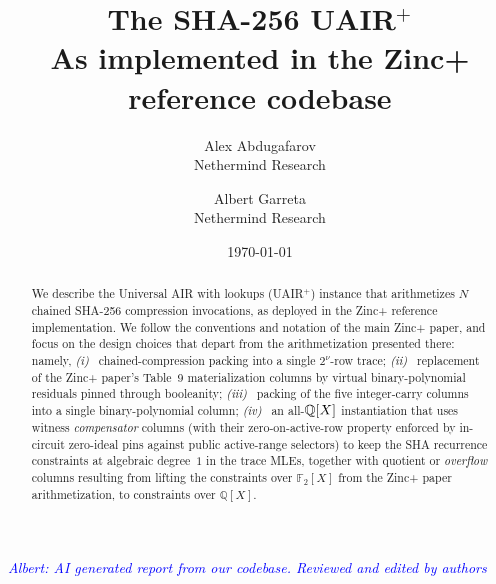 \documentclass[11pt]{article}
\title{The SHA-256 UAIR$^+$ \\
       \large As implemented in the Zinc+ reference codebase}
\author{Alex Abdugafarov \\[2pt] \normalsize Nethermind Research \and Albert Garreta \\[2pt] \normalsize Nethermind Research}
\date{\today}
\begin{document}
\maketitle

\begin{center}
\textcolor{blue}{\textit{Albert: AI generated report from our codebase. Reviewed and edited by authors}}
\end{center}
\vspace{0.5em}

\begin{abstract}
We describe the Universal AIR with lookups (UAIR$^+$) instance that
arithmetizes $N$ chained SHA-256 compression invocations, as deployed
in the Zinc+ reference implementation. We follow the conventions and
notation of the main Zinc+ paper, and focus on the design choices
that depart from the  arithmetization presented there:
namely, \emph{(i)}~ chained-compression packing into a single
$2^{\nu}$-row trace; \emph{(ii)}~ replacement of the  Zinc+ paper's Table~9
materialization columns by virtual binary-polynomial residuals pinned
through booleanity; \emph{(iii)}~ packing of the five integer-carry
columns into a single binary-polynomial column;
\emph{(iv)}~ an all-$\mathbb{Q}[X]$ instantiation that uses witness
\emph{compensator} columns (with their zero-on-active-row property
enforced by in-circuit zero-ideal pins against public active-range
selectors) to keep the SHA recurrence constraints at algebraic
degree~$1$ in the trace MLEs, together with quotient or
\emph{overflow} columns resulting from lifting the constraints over
$\mathbb{F}_2[X]$ from the Zinc+ paper arithmetization, to
constraints over $\mathbb{Q}[X]$.
\end{abstract}

\tableofcontents





\end{document}
